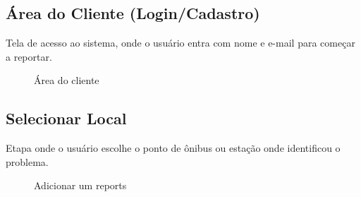\documentclass[12pt,a4paper]{article}
\begin{document}
\subsection{Área do Cliente (Login/Cadastro)}
Tela de acesso ao sistema, onde o usuário entra com nome e e-mail para começar a reportar.

\begin{figure}[H]
\centering
{}
\caption{Área do cliente}
\end{figure}

\subsection{Selecionar Local}
Etapa onde o usuário escolhe o ponto de ônibus ou estação onde identificou o problema.

\begin{figure}[H]
\centering
{}
\caption{Adicionar um reports}
\end{figure}
\end{document}
